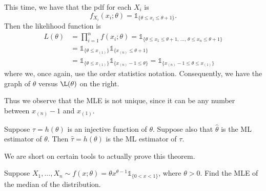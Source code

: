 \documentclass[notoc,notitlepage]{tufte-book}
\begin{document}
\begin{solution}
  This time, we have that the pdf for each $X_i$ is
  \begin{equation*}
    f_{X_i}(x_i ; \theta) = \mathbb{1}_{\{\theta \leq x_i \leq \theta + 1\}}.
  \end{equation*}
  Then the likelihood function is
  \begin{align*}
    L(\theta) &= \prod_{i=1}^{n} f(x_i; \theta) = \mathbb{1}_{\{\theta \leq x_1 \leq \theta + 1, \, ..., \, \theta \leq x_n \leq \theta + 1\}} \\
              &= \mathbb{1}_{\{\theta \leq x_{(1)}\}} \mathbb{1}_{\{ x_{(n)} \leq \theta + 1 \} } \\
              &= \mathbb{1}_{\{\theta \leq x_{(1)}\}} \mathbb{1}_{\{ x_{(n)} - 1 \leq \theta \} } = \mathbb{1}_{\{x_{(n)} - 1 \leq \theta \leq x_{(1)} \}}
  \end{align*}
  where we, once again, use the order statistics notation. Consequently, we have the graph of $\theta$ versus $\L(\theta)$ on the right.

  Thus we observe that the MLE is not unique, since it can be any number between $x_{(n)} - 1$ and $x_{(1)}$.
\end{solution}

\begin{thm}
\label{thm:invariance_property_of_the_mle}
  Suppose $\tau = h(\theta)$ is an injective function of $\theta$. Suppose also that $\hat{\theta}$ is the ML estimator of $\theta$. Then $\hat{\tau} = h(\theta)$ is the ML estimator of $\tau$.
\end{thm}

\begin{warning}
  We are short on certain tools to actually prove this theorem.
\end{warning}

\begin{eg}[Example 6.9]
  Suppose $X_1, ..., X_n \sim f(x; \theta) = \theta x^{\theta - 1} \mathbb{1}_{\{0 < x < 1\}}$, where $\theta > 0$. Find the MLE of the median of the distribution.
\end{eg}
\end{document}
